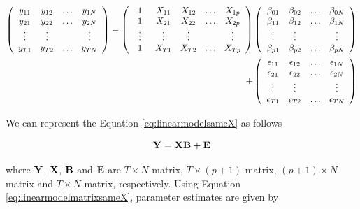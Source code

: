 \documentclass[11pt,a4paper,]{article}
\begin{document}
\begin{equation}\label{eq:linearmodelsameX}
\begin{split}
\left(\begin{array}{cccc}  
 y_{11} & y_{12} & \dots & y_{1N}\\
 y_{21} & y_{22} & \dots & y_{2N}\\
 \vdotswithin{\ddots} & \vdotswithin{\ddots} & & \vdotswithin{\ddots}\\
 y_{T1} & y_{T2} & \dots & y_{TN}
 \end{array}\right) =
 \left(\begin{array}{ccccc}
 1 & X_{11} & X_{12} & \dots & X_{1p}\\
 1 & X_{21} & X_{22} & \dots & X_{2p}\\
 \vdotswithin{\ddots} & \vdotswithin{\ddots} & \vdotswithin{\ddots} & & \vdotswithin{\ddots}\\
 1 & X_{T1} & X_{T2} & \dots & X_{Tp}
 \end{array}\right)
 \left(\begin{array}{cccc}
 \beta_{01} & \beta_{02} & \dots & \beta_{0N}\\
 \beta_{11} & \beta_{12} & \dots & \beta_{1N}\\
 \vdotswithin{\ddots} & \vdotswithin{\ddots} & & \vdotswithin{\ddots}\\
 \beta_{p1} & \beta_{p2} & \dots & \beta_{pN}
 \end{array}\right) \\
 +\left(\begin{array}{cccc} 
 \epsilon_{11} & \epsilon_{12} & \dots & \epsilon_{1N}\\
 \epsilon_{21} & \epsilon_{22} & \dots & \epsilon_{2N}\\
 \vdotswithin{\ddots} & \vdotswithin{\ddots} & & \vdotswithin{\ddots}\\
 \epsilon_{T1} & \epsilon_{T2} & \dots & \epsilon_{TN}
 \end{array}\right)
 \end{split}
 \end{equation}

We can represent the Equation \eqref{eq:linearmodelsameX} as follows

\begin{equation}\label{eq:linearmodelmatrixsameX}
{\bf Y}= {\bf X} {\bf B} + {\bf E}
\end{equation}

where \(\bf Y\), \(\bf X\), \(\bf B\) and \(\bf E\) are
\(T\times N\)-matrix, \(T\times (p+1)\)-matrix, \((p+1)\times N\)-matrix
and \(T \times N\)-matrix, respectively. Using Equation
\eqref{eq:linearmodelmatrixsameX}, parameter estimates are given by
\end{document}
